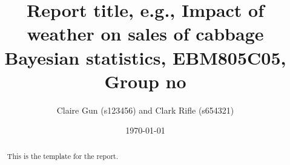 \documentclass[a4paper,11pt]{article}
\author{Claire Gun (s123456) and Clark Rifle (s654321)}
\date{\today}
\title{Report title, e.g., Impact of weather on sales of cabbage\\
  Bayesian statistics, EBM805C05,  Group no}
\theoremstyle{definition}
\numberwithin{equation}{section}
\newcommand{\1}[1]{\,I_{#1}} %
\begin{document}
\maketitle

\begin{abstract}
  This is the template for the report.
\end{abstract}








\appendix



\end{document}
